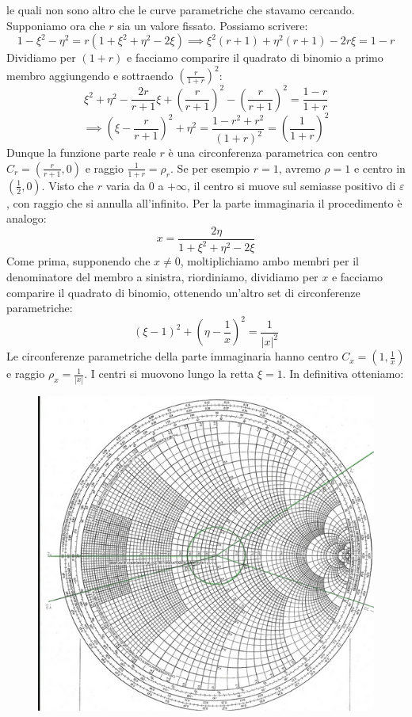\documentclass{book}
\begin{document}
        le quali non sono altro che le curve parametriche che stavamo cercando. Supponiamo ora che $r$ sia un valore fissato. Possiamo scrivere:
        \begin{equation}
            1-\xi ^{2} - \eta ^{2}= r (1+\xi^{2}+\eta^{2}-2\xi) \implies \xi^{2}(r+1)+\eta^{2}(r+1)-2r \xi = 1-r
        \end{equation}
        Dividiamo per $(1+r)$ e  facciamo comparire il quadrato di binomio a primo membro aggiungendo e sottraendo
        $(\frac{r}{1+r})^{2}$:
        \begin{equation}
            \xi^{2}+\eta ^{2}-\frac{2r}{r+1}\xi + (\frac{r}{r+1} )^{2}- (\frac{r}{r+1} )^{2} = \frac{1-r}{1+r}
        \end{equation} 
        \begin{equation}
            \implies (\xi-\frac{r}{r+1}) ^{2}+\eta ^{2} = \frac{1-r^{2}+r^{2}}{(1+r)^{2}} = (\frac{1}{1+r})^{2}
        \end{equation}
        Dunque la funzione parte reale $r$ è una circonferenza parametrica con centro
         $C_{r} = \displaystyle (\frac{r}{r+1},0)$ e raggio $\displaystyle \frac{1}{1+r} = \rho_{r}$.
         Se per esempio $r=1$, avremo $\rho = 1$ e centro in $(\frac{1}{2}, 0)$. Visto che $r$ varia da $0$ a $+\infty$,
         il centro si muove sul semiasse positivo di $\varepsilon$, con raggio che si annulla all'infinito. \newpage
         Per la parte immaginaria il procedimento è analogo:
         \begin{equation}
            x = \frac{2\eta}{1+\xi ^{2}+\eta ^{2}-2\xi}
         \end{equation}
        Come prima, supponendo che $x \neq 0$, moltiplichiamo ambo membri per il denominatore del membro a sinistra, riordiniamo, dividiamo per $x$ e facciamo 
        comparire il quadrato di binomio, ottenendo un'altro set di circonferenze parametriche:
        \begin{equation}
            (\xi -1) ^{2}+(\eta-\frac{1}{x})^{2}=\frac{1}{|x|^{2}}
        \end{equation}
        Le circonferenze parametriche della parte immaginaria hanno centro $C_{x} = \displaystyle (1, \frac{1}{x})$ 
        e raggio $\rho_{x} = \displaystyle \frac{1}{|x|}$. I centri si muovono lungo la retta $\xi=1$.
        In definitiva otteniamo:
        \begin{figure}[h!]
            \center  
            \includegraphics[width=0.6\linewidth]{Chapter_two/Chapt2img23.png}
        \end{figure}\\
\end{document}
